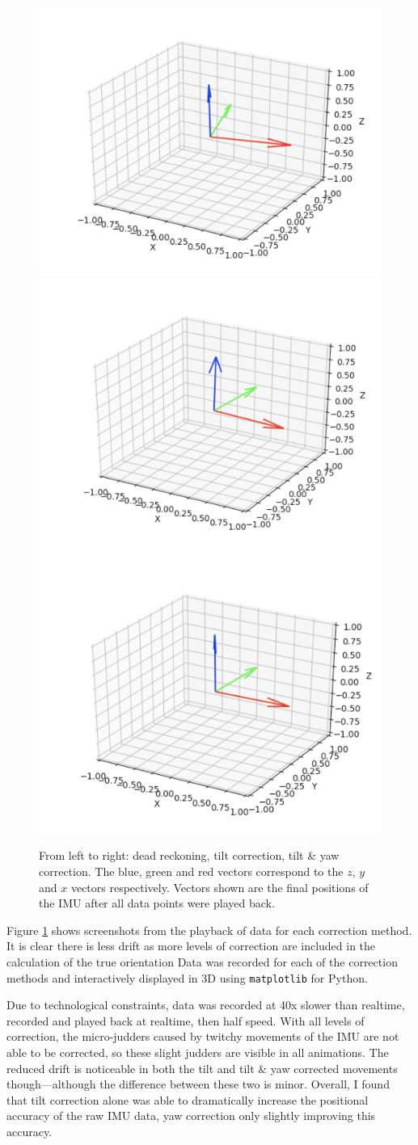 \documentclass[11pt]{article}
\begin{document}
\begin{figure}[htp]

\centering
\includegraphics[width=.32\textwidth]{4gyro_after}\hfill
\includegraphics[width=.32\textwidth]{5acc_after}\hfill
\includegraphics[width=.32\textwidth]{6mag_after}

\caption{From left to right: dead reckoning, tilt correction, tilt \& yaw correction. The blue, green and red vectors correspond to the $z$, $y$ and $x$ vectors respectively. Vectors shown are the final positions of the IMU after all data points were played back.}
\label{fig:3d}

\end{figure}

Figure \ref{fig:3d} shows screenshots from the playback of data for each correction method. It is clear there is less drift as more levels of correction are included in the calculation of the true orientation Data was recorded for each of the correction methods and interactively displayed in 3D using \texttt{matplotlib} for Python. 

Due to technological constraints, data was recorded at 40x slower than realtime, recorded and played back at realtime, then half speed. With all levels of correction, the micro-judders caused by twitchy movements of the IMU are not able to be corrected, so these slight judders are visible in all animations. The reduced drift is noticeable in both the tilt and tilt \& yaw corrected movements though---although the difference between these two is minor. Overall, I found that tilt correction alone was able to dramatically increase the positional accuracy of the raw IMU data, yaw correction only slightly improving this accuracy.
\end{document}
